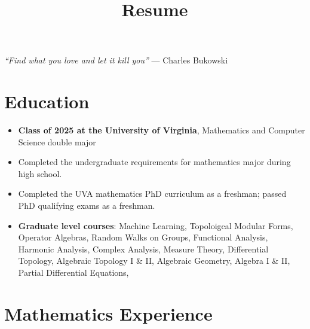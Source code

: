 \documentclass[11pt,letterpaper,sans]{moderncv}
\title{Resume}
\begin{document}
\makecvtitle %
\vspace*{-3.5em}

\vspace*{-1em}
\begin{center}
\textcolor{color1}{\textit{``Find what you love and let it kill you''} --- Charles Bukowski}
\end{center}

%


\section{Education}

\begin{itemize}
  \item \textbf{Class of 2025 at the University of Virginia}, Mathematics and Computer Science double major
  \item Completed the undergraduate requirements for mathematics major during high school.
  \item Completed the UVA mathematics PhD curriculum as a freshman; passed PhD qualifying exams as a freshman.
  \item \textbf{Graduate level courses}: Machine Learning, Topoloigcal Modular Forms, Operator Algebras, Random Walks on Groups, Functional Analysis, Harmonic Analysis, Complex Analysis, Measure Theory, Differential Topology, Algebraic Topology I \& II, Algebraic Geometry, Algebra I \& II, Partial Differential Equations, 
\end{itemize}



\section{Mathematics Experience}
\end{document}
